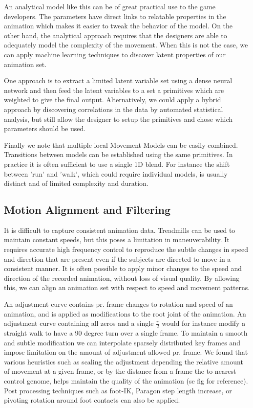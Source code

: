 An analytical model like this can be of great practical use to the game developers. The parameters have direct links to relatable properties in the animation which makes it easier to tweak the behavior of the model. On the other hand, the analytical approach requires that the designers are able to adequately model the complexity of the movement. When this is not the case, we can apply machine learning techniques to discover latent properties of our animation set. 

One approach is to extract a limited latent variable set using a dense neural network and then feed the latent variables to a set a primitives which are weighted to give the final output. 
Alternatively, we could apply a hybrid approach by discovering correlations in the data by automated statistical analysis, but still allow the designer to setup the primitives and chose which parameters should be used. 

Finally we note that multiple local Movement Models can be easily combined. Transitions between models can be established using the same primitives. In practice it is often sufficient to use a single 1D blend. For instance the shift between 'run' and 'walk', which could require individual models, is usually distinct and of limited complexity and duration. 

\subsection{Motion Alignment and Filtering}
It is difficult to capture consistent animation data. Treadmills can be used to maintain constant speeds, but this poses a limitation in maneuverability. It requires accurate high frequency control to reproduce the subtle changes in speed and direction that are present even if the subjects are directed to move in a consistent manner. It is often possible to apply minor changes to the speed and direction of the recorded animation, without loss of visual quality. By allowing this, we can align an animation set with respect to speed and movement patterns. 

An adjustment curve contains pr. frame changes to rotation and speed of an animation, and is applied as modifications to the root joint of the animation. An adjustment curve containing all zeros and a single $\frac{\pi}{2}$ would for instance modify a straight walk to have a 90 degree turn over a single frame. To maintain a smooth and subtle modification we can interpolate sparsely distributed key frames and impose limitation on the amount of adjustment allowed pr. frame. We found that various heuristics such as scaling the adjustment depending the relative amount of movement at a given frame, or by the distance from a frame the to nearest control genome, helps maintain the quality of the animation (se fig for reference). Post processing techniques such as foot-IK, Paragon step length increase, or pivoting rotation around foot contacts can also be applied.

